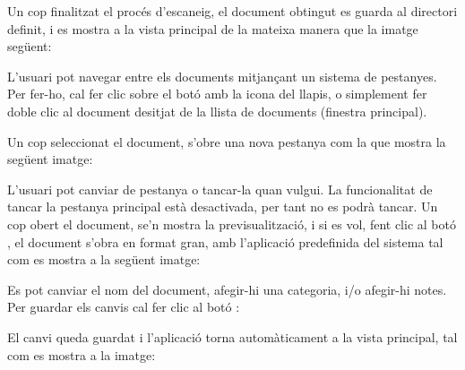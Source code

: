 \documentclass[letterpaper,11pt,catalan]{sphinxmanual}
\begin{document}
Un cop finalitzat el procés d'escaneig, el document obtingut es guarda al directori definit, i es
mostra a la vista principal de la mateixa manera que la imatge següent:


\begin{DUlineblock}{0em}
\item[] 
\end{DUlineblock}

L'usuari pot navegar entre els documents mitjançant un sistema de pestanyes. Per fer-ho,
cal fer clic sobre el botó amb la icona del llapis, o simplement fer doble clic al document
desitjat de la llista de documents (finestra principal).

Un cop seleccionat el document, s'obre una nova pestanya com la que mostra la següent imatge:


L'usuari pot canviar de pestanya o tancar-la quan vulgui. La funcionalitat de tancar
la pestanya principal està desactivada, per tant no es podrà tancar.
Un cop obert el document, se'n mostra la previsualització, i si es vol, fent clic
al botó , el document s'obra en format gran, amb l'aplicació predefinida del sistema tal
com es mostra a la següent imatge:


Es pot canviar el nom del document, afegir-hi una categoria, i/o afegir-hi notes.
Per guardar els canvis cal fer clic al botó :


El canvi queda guardat i l'aplicació torna automàticament a la vista principal, tal
com es mostra a la imatge:

\end{document}
